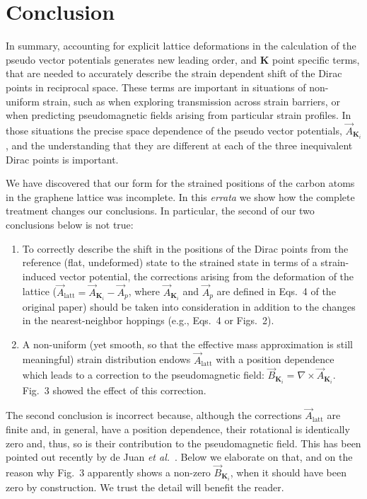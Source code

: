 \section{Conclusion}

In summary, accounting for explicit lattice deformations in the calculation of the pseudo vector potentials generates new leading order, and $\bm{K}$ point specific terms, that are needed to accurately describe the strain dependent shift of the Dirac points in reciprocal space. These terms are important in situations of non-uniform strain, such as when exploring transmission across strain barriers, or when predicting pseudomagnetic fields arising from particular strain profiles.
In those situations the precise space dependence of the pseudo vector potentials, $\vec{A}_{\bm{K}_i}$, and the understanding that they are different at each of the three inequivalent Dirac points is important.

\setlength{\parindent}{0em}
\setlength{\parskip}{1em}


We have discovered that our form for the strained positions of the carbon atoms in the graphene lattice was incomplete. In this \emph{errata} we show how the complete treatment changes our conclusions. In particular, the second of our two conclusions below is not true:
%
\begin{enumerate}
  \item To correctly describe the shift in the positions of the Dirac points from the reference (flat, undeformed) state to the strained state in terms of a strain-induced vector potential, the corrections arising from the deformation of the lattice ($\vec{A}_\text{latt}=\vec{A}_{\bm{K}_i}-\vec{A}_p$, where $\vec{A}_{\bm{K}_i}$ and $\vec{A}_p$ are defined in Eqs.~4 of the original paper) should be taken into consideration in addition to the changes in the nearest-neighbor hoppings (e.g., Eqs.~4 or Figs.~2).
  \item A non-uniform (yet smooth, so that the effective mass approximation is still meaningful) strain distribution endows $\vec{A}_\text{latt}$ with a position dependence which leads to a correction to the pseudomagnetic field: $\vec{B}_{\bm{K}_i} =\nabla\times\vec{A}_{\bm{K}_i}$. Fig.~3 showed the effect of this correction.
\end{enumerate}

The second conclusion is incorrect because, although the corrections $\vec{A}_\text{latt}$ are finite and, in general, have a position dependence, their rotational is identically zero and, thus, so is their contribution to the pseudomagnetic field. This has been pointed out recently by de Juan \emph{et al.}~\cite{deJuan:2012}. Below we elaborate on that, and on the reason why Fig.~3 apparently shows a non-zero $\vec{B}_{\bm{K}_i}$, when it should have been zero by construction. We trust the detail will benefit the reader.

